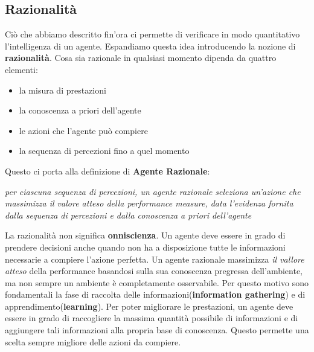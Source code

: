 \subsection{Razionalità}
Ciò che abbiamo descritto fin'ora ci permette di verificare in modo quantitativo l'intelligenza di un agente.
Espandiamo questa idea introducendo la nozione di \textbf{razionalità}.
Cosa sia razionale in qualsiasi momento dipenda da quattro elementi:
\begin{itemize}
  \item la misura di prestazioni
  \item la conoscenza a priori dell'agente
  \item le azioni che l'agente può compiere
  \item la sequenza di percezioni fino a quel momento
\end{itemize}
Questo ci porta alla definizione di \textbf{Agente Razionale}:
      \begin{center}
      \emph{per ciascuna sequenza di percezioni, un agente razionale seleziona un'azione che massimizza il valore atteso della performance measure, data l'evidenza 
      fornita dalla sequenza di percezioni e dalla conoscenza a priori dell'agente}
      \end{center}
La razionalità non significa \textbf{onniscienza}. Un agente deve essere in grado di prendere decisioni anche quando
non ha a disposizione tutte le informazioni necessarie a compiere l'azione perfetta. Un agente razionale massimizza \emph{il vallore atteso} della performance
basandosi sulla sua conoscenza pregressa dell'ambiente, ma  non sempre un ambiente è completamente osservabile. Per questo motivo sono
fondamentali la fase di raccolta delle informazioni(\textbf{information gathering}) e di apprendimento(\textbf{learning}). Per poter
migliorare le prestazioni, un  agente deve essere in grado di raccogliere la massima quantità possibile di informazioni
e di aggiungere tali informazioni alla propria base di conoscenza. Questo permette una scelta sempre migliore delle azioni da compiere.\cite{aima}
